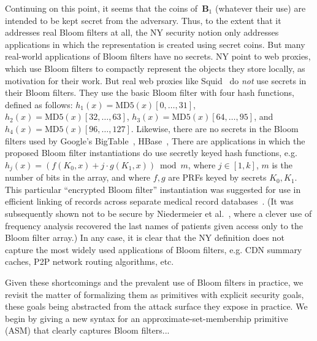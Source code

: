 Continuing on this point, it seems that the coins of~$\mathbf{B}_1$ (whatever their use) are intended to be kept secret from the adversary.  Thus, to the extent that it addresses real Bloom filters at all, the NY security notion only addresses applications in which the representation is created using secret coins.  But many real-world applications of Bloom filters have no secrets.  NY point to web proxies, which use Bloom filters to compactly represent the objects they store locally, as motivation for their work.  But real web proxies like Squid~\cite{xxx} do \emph{not} use secrets in their Bloom filters.  They use the basic Bloom filter with four hash functions, defined as follows: $h_1(x) = \mathrm{MD5}(x)[0,\ldots,31]$, $h_2(x)=\mathrm{MD5}(x)[32,\ldots,63]$, $h_3(x)=\mathrm{MD5}(x)[64,\ldots,95]$, and $h_4(x)=\mathrm{MD5}(x)[96,\ldots,127]$.  Likewise, there are no secrets in the Bloom filters used by Google's BigTable~\cite{xxx}, HBase~\cite{xxx},   There are applications in which the proposed Bloom filter instantiations do use secretly keyed hash functions, e.g. $h_j(x) = (f(K_0,x) + j\cdot g(K_1,x))\bmod m$, where $j\in[1,k]$, $m$ is the number of bits in the array, and where $f,g$ are PRFs keyed by secrets $K_0,K_1$.  This particular ``encrypted Bloom filter'' instantiation was suggested for use in efficient linking of records across separate medical record databases~\cite{xxx}.  (It was subsequently shown not to be secure by Niedermeier et al.~\cite{xxx}, where a clever use of frequency analysis recovered the last names of patients given access only to the Bloom filter array.)  In any case, it is clear that the NY definition does not capture the most widely used applications of Bloom filters, e.g. CDN summary caches, P2P network routing algorithms, etc.


Given these shortcomings and the prevalent use of Bloom filters in practice, we revisit the matter of formalizing them as primitives with explicit security goals, these goals being abstracted from the attack surface they expose in practice.   We begin by giving a new syntax for an approximate-set-membership primitive (ASM) that clearly captures Bloom filters... 

